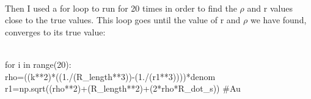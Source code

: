 \documentclass[letterpaper,12pt]{article}
\begin{document}
\\Then I used a for loop to run for 20 times in order to find the \begin{math} \rho \end{math} and r values close to the true values. This loop goes until the value of r and \begin{math} \rho \end{math} we have found, converges to its true value:

\\for i in range(20):
  \\  rho=((k**2)*((1./(R_length**3))-(1./(r1**3))))*denom
    \\r1=np.sqrt((rho**2)+(R_length**2)+(2*rho*R_dot_s)) #Au
    
    
    
 

\end{document}

